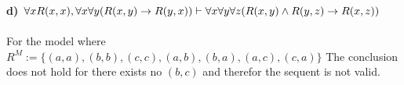 \documentclass[12pt,oneside,reqno]{amsart}
\begin{document}
\textbf{d) $\forall x R(x,x), \forall x \forall y(R(x,y) \rightarrow{} R(y,x)) \vdash \forall x \forall y \forall z(R(x,y) \land R(y,z) \rightarrow{} R(x,z)) $}\\\\
For the model where $R^M := \{(a,a), (b,b), (c,c), (a,b), (b,a), (a,c), (c,a)\}$ The conclusion does not hold for there exists no $(b,c)$ and therefor the sequent is not valid.
\end{document}
